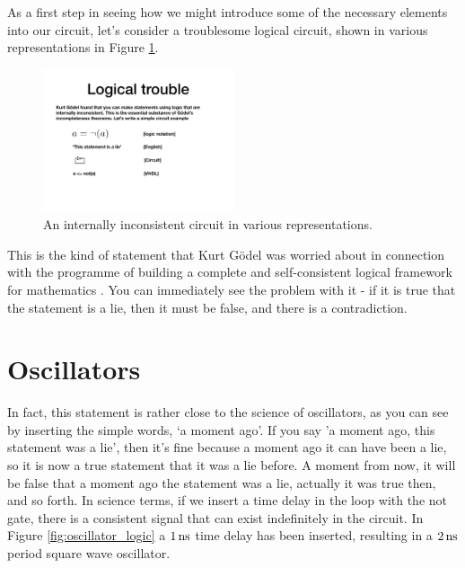 \documentclass[../physical_computing.tex]{subfiles}
\begin{document}
As a first step in seeing how we might introduce some of the necessary elements into our circuit, let's consider a troublesome logical
circuit, shown in various representations in Figure 
\ref{fig:self_contradicting_logic}.

\begin{figure}[htbp]
    \centering
    \includegraphics[width=0.5\textwidth]
    {figures/self_contradicting_logic.pdf}
    \caption{An internally inconsistent circuit in various
    representations.}
    \label{fig:self_contradicting_logic}
\end{figure}

This is the kind of statement that Kurt G\"odel was worried about
in connection with the programme of building a complete and self-consistent logical framework for mathematics \cite{Hofstadter:99665,Smullyan}. You can 
immediately see the problem with it - if it is true that the
statement is a lie, then it must be false, and there is a 
contradiction.

\section{Oscillators}
\label{sec:oscillators}

In fact, this statement is rather close to the science of 
oscillators, as you can see by inserting the simple words,
`a moment ago'. If you say 'a moment ago, this statement was
a lie', then it's fine because a moment ago it can have been 
a lie, so it is now a true statement that it was a lie
before. A moment from now, it will be false that a moment ago
the statement was a lie, actually it was true then, and so forth.
In science terms, if we insert a time delay in the loop with 
the not gate, there is a consistent signal that can exist
indefinitely in the circuit.
In Figure \ref{fig:oscillator_logic} a $\rm 1\,ns$
time delay has been inserted, resulting in a $\rm 2\,ns$ period
square wave oscillator.
\end{document}
